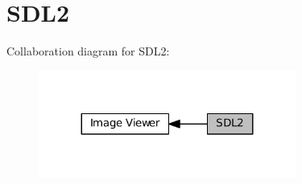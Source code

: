 \hypertarget{group__SDL2}{}\section{S\+D\+L2}
\label{group__SDL2}
Collaboration diagram for S\+D\+L2\+:
\nopagebreak
\begin{figure}[H]
\begin{center}
\leavevmode
\includegraphics[width=239pt]{group__SDL2}
\end{center}
\end{figure}
